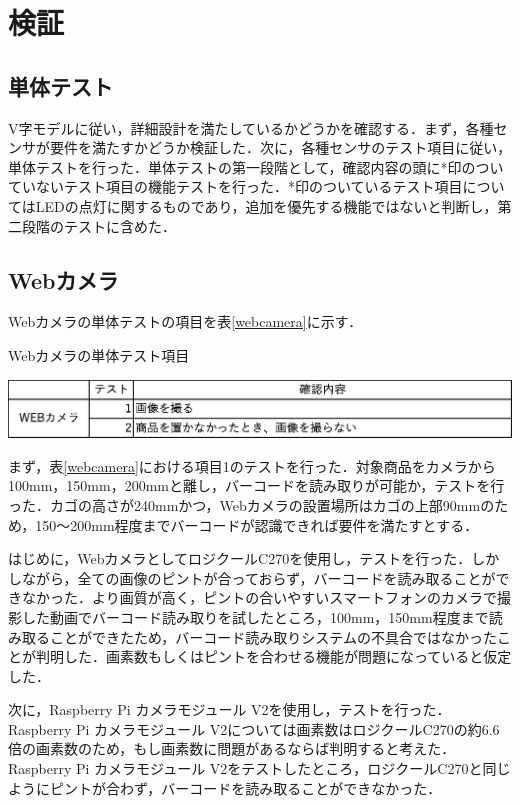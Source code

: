 

\section{検証}

\subsection{単体テスト}

V字モデルに従い，詳細設計を満たしているかどうかを確認する．まず，各種センサが要件を満たすかどうか検証した．次に，各種センサのテスト項目に従い，単体テストを行った．単体テストの第一段階として，確認内容の頭に*印のついていないテスト項目の機能テストを行った．*印のついているテスト項目についてはLEDの点灯に関するものであり，追加を優先する機能ではないと判断し，第二段階のテストに含めた．


\subsection*{Webカメラ}

Webカメラの単体テストの項目を表\ref{webcamera}に示す．


\begin{table}[htbp]
\centering
\caption{Webカメラの単体テスト項目}
\includegraphics[width = 15cm]{./picture/webcamera.eps}
\label{webcamera}
\end{table}

まず，表\ref{webcamera}における項目1のテストを行った．対象商品をカメラから100mm，150mm，200mmと離し，バーコードを読み取りが可能か，テストを行った．カゴの高さが240mmかつ，Webカメラの設置場所はカゴの上部90mmのため，150～200mm程度までバーコードが認識できれば要件を満たすとする．

はじめに，WebカメラとしてロジクールC270を使用し，テストを行った．しかしながら，全ての画像のピントが合っておらず，バーコードを読み取ることができなかった．より画質が高く，ピントの合いやすいスマートフォンのカメラで撮影した動画でバーコード読み取りを試したところ，100mm，150mm程度まで読み取ることができたため，バーコード読み取りシステムの不具合ではなかったことが判明した．画素数もしくはピントを合わせる機能が問題になっていると仮定した．

次に，Raspberry Pi カメラモジュール V2を使用し，テストを行った．Raspberry Pi カメラモジュール V2については画素数はロジクールC270の約6.6倍の画素数のため，もし画素数に問題があるならば判明すると考えた．Raspberry Pi カメラモジュール V2をテストしたところ，ロジクールC270と同じようにピントが合わず，バーコードを読み取ることができなかった．


